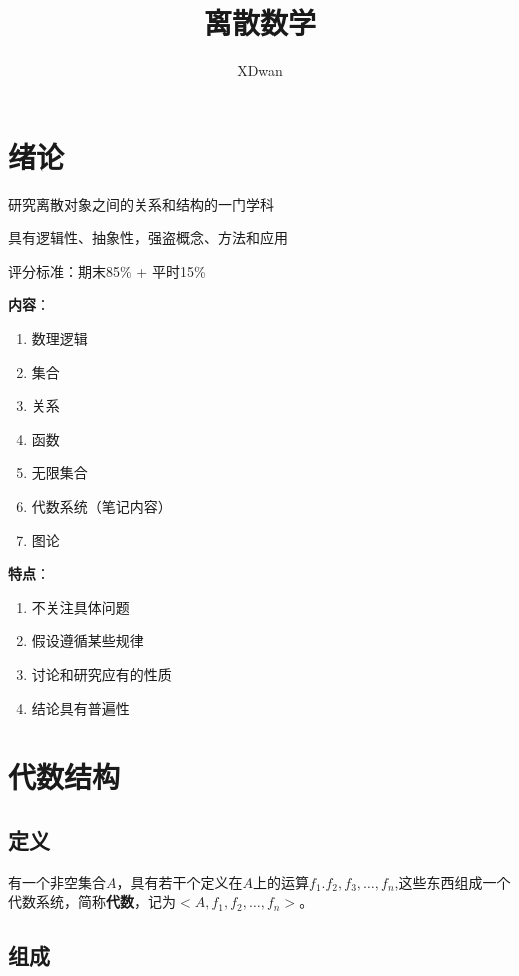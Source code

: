 \documentclass{article}
\title{离散数学}
\author{XDwan}
\begin{document}
    
\maketitle

\renewcommand{\contentsname}{目录}%
\tableofcontents
\newpage

\section{绪论}

研究离散对象之间的关系和结构的一门学科

具有逻辑性、抽象性，强盗概念、方法和应用

评分标准：期末85\% + 平时15\%

\textbf{内容}：

\begin{enumerate}
    \item 数理逻辑
    \item 集合
    \item 关系
    \item 函数
    \item 无限集合
    \item 代数系统（笔记内容）
    \item 图论
\end{enumerate}

\textbf{特点}：

\begin{enumerate}
    \item 不关注具体问题
    \item 假设遵循某些规律
    \item 讨论和研究应有的性质
    \item 结论具有普遍性
\end{enumerate}


\newpage

\section{代数结构}

\subsection{定义}

有一个非空集合$A$，具有若干个定义在$A$上的运算$f_1.f_2,f_3,\dots ,f_n$,这些东西组成一个代数系统，简称\textbf{代数}，记为$<A,f_1,f_2,\dots,f_n>$。

\subsection{组成}
\end{document}
